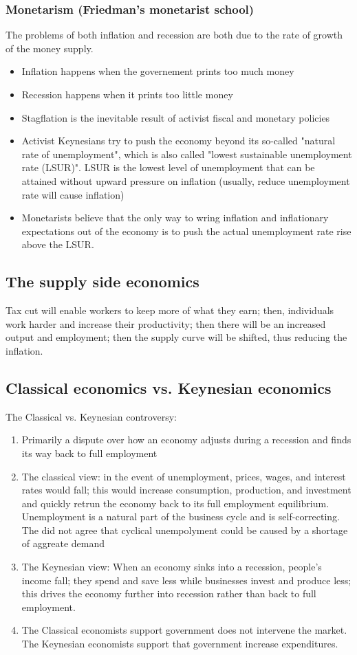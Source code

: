 \documentclass[a4paper,13pt]{report}
\begin{document}
\subsubsection{Monetarism (Friedman's monetarist school)}
The problems of both inflation and recession are both due to the rate of growth of the money supply.
\begin{itemize}
    \item Inflation happens when the governement prints too much money
    \item Recession happens when it prints too little money
    \item Stagflation is the inevitable result of activist fiscal and monetary policies
    \item Activist Keynesians try to push the economy beyond its so-called "natural rate of unemployment", which is also called "lowest sustainable unemployment rate (LSUR)". LSUR is the lowest level of unemployment that can be attained without upward pressure on inflation (usually, reduce unemployment rate will cause inflation)
    \item Monetarists believe that the only way to wring inflation and inflationary expectations out of the economy is to push the actual unemployment rate rise above the LSUR.
\end{itemize}

\subsection{The supply side economics}
Tax cut will enable workers to keep more of what they earn; then, individuals work harder and increase their productivity; then there will be an increased output and employment; then the supply curve will be shifted, thus reducing the inflation.


\subsection{Classical economics vs. Keynesian economics}
The Classical vs. Keynesian controversy:
\begin{enumerate}
    \item Primarily a dispute over how an economy adjusts during a recession and finds its way back to full employment
    \item The classical view: in the event of unemployment, prices, wages, and interest rates would fall; this would increase consumption, production, and investment and quickly retrun the economy back to its full employment equilibrium. Unemployment is a natural part of the business cycle and is self-correcting. The did not agree that cyclical unempolyment could be caused by a shortage of aggreate demand
    \item The Keynesian view: When an economy sinks into a recession, people's income fall; they spend and save less while businesses invest and produce less; this drives the economy further into recession rather than back to full employment. 
    \item The Classical economists support government does not intervene the market. The Keynesian economists support that government increase expenditures.   
\end{enumerate}
\end{document}
